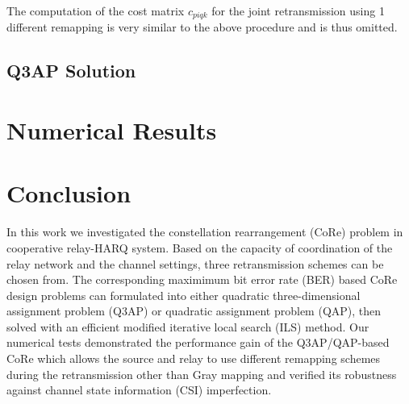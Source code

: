 \documentclass[conference]{IEEEtran}
\begin{document}
The computation of the cost matrix $c_{piqk}$ for the joint
retransmission using 1 different remapping is very similar to the above
procedure and is thus omitted.
\subsection{Q3AP Solution}

\section{Numerical Results}
\label{sec:simulation}







\section{Conclusion}
\label{sec:conclusion}
In this work we investigated the constellation rearrangement (CoRe) problem in
cooperative relay-HARQ system. Based on the capacity of coordination of the
relay network and the channel settings, three retransmission schemes can be
chosen from. The corresponding maximimum bit error rate (BER) based CoRe design
problems can formulated into either quadratic three-dimensional assignment
problem (Q3AP) or quadratic assignment problem (QAP), then solved with an
efficient modified iterative local search (ILS) method. Our numerical tests
demonstrated the performance gain of the Q3AP/QAP-based CoRe which allows the
source and relay to use different remapping schemes during the retransmission other
than Gray mapping and verified its robustness against channel state information
(CSI) imperfection.










\end{document}
